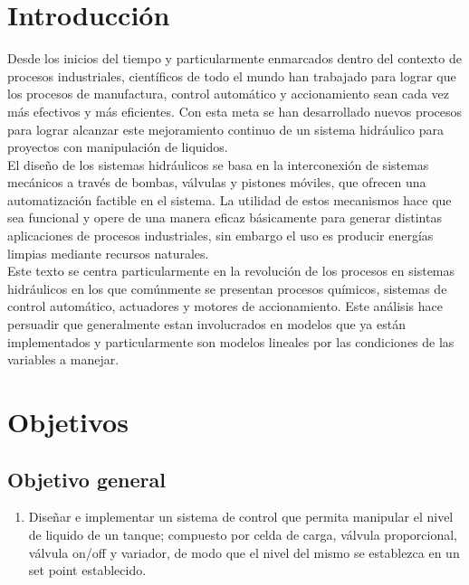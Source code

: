 \documentclass[a4paper,12pt,twoside]{proyectotanquesecci}
\begin{document}
\newpage





\section{Introducción}

Desde los inicios del tiempo y particularmente enmarcados dentro del contexto de procesos industriales, científicos de todo el mundo han trabajado para lograr que los procesos de manufactura, control automático y accionamiento sean cada vez más efectivos y más eficientes. Con esta meta se han desarrollado nuevos procesos para lograr alcanzar este mejoramiento continuo de un sistema hidráulico para proyectos con manipulación de liquidos.\\

El diseño de los sistemas hidráulicos se basa en la interconexión de  sistemas mecánicos a través de bombas, válvulas y pistones móviles, que ofrecen una automatización factible  en el sistema. La utilidad de estos mecanismos hace que sea  funcional y  opere de una manera  eficaz básicamente para generar distintas aplicaciones de procesos industriales, sin embargo el uso es producir energías limpias mediante recursos naturales.\\

Este texto se centra particularmente en la revolución de los procesos en sistemas hidráulicos en los que comúnmente se presentan procesos químicos, sistemas de control automático, actuadores y motores de accionamiento. Este análisis hace persuadir que generalmente estan involucrados en modelos que ya están implementados y particularmente son modelos lineales por las condiciones de las variables a manejar.\\

\newpage




\section{Objetivos}

\subsection{Objetivo general}

\begin{enumerate}
\item Diseñar e implementar un sistema de control que permita manipular el nivel de liquido de un tanque; compuesto por celda de carga, válvula proporcional, válvula on/off y variador, de modo que el nivel del mismo se establezca en un set point establecido.
\end{enumerate}
\end{document}
